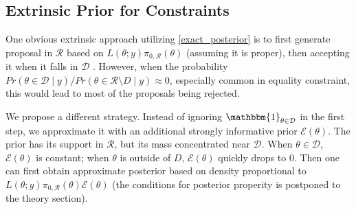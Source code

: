 \documentclass[10pt]{article}
\newcommand{\mc}[1]{\mathcal{#1}}
\DeclareMathOperator{\1}{\mathbbm{1}}
\begin{document}



\subsection{Extrinsic Prior for Constraints}

One obvious extrinsic approach utilizing \eqref{exact_posterior} is to first generate proposal in $\mc R$ based on $L(\theta;y)\pi_{0,\mc R}(\theta)$ (assuming it is proper), then accepting it when it falls in $\mc D$ \citep{gelfand1992bayesian}. However, when the probability $Pr(\theta\in \mc D \mid y) / Pr(\theta\in \mc R \setminus D \mid y) \approx 0$, especially common in equality constraint, this would lead to most of the proposals being rejected.

We propose a different strategy. Instead of ignoring $\mathbbm{1}_{\theta\in \mc D} $ in the first step, we approximate it with an additional strongly informative prior $\mc E(\theta)$. The prior has its support in $\mc R$, but its mass concentrated near $\mc D$. When $\theta \in \mc D$, $\mc E(\theta)$ is constant; when $\theta$ is outside of $D$, $\mc E(\theta)$ quickly drops to $0$. Then one can first obtain approximate posterior based on density proportional to $L(\theta;y)\pi_{0,\mc R}(\theta)\mc E(\theta)$ (the conditions for posterior properity is postponed to the theory section).
\end{document}
